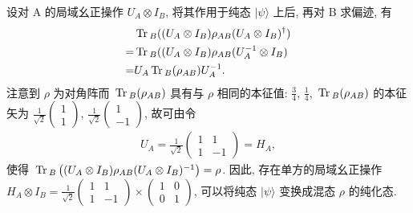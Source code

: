 \documentclass{assignment}
\begin{document}
\begin{sol}
\begin{itemize}
        设对 A 的局域幺正操作 $U_A\otimes I_B$, 将其作用于纯态 $\lvert\psi\rangle$ 上后, 再对 B 求偏迹, 有
        \begin{align}
            \notag&\,\mathrm{Tr}\,_B((U_A\otimes I_B)\rho_{AB}(U_A\otimes I_B)^{\dagger})\\
            =&\,\mathrm{Tr}\,_B((U_A\otimes I_B)\rho_{AB}(U_A^{-1}\otimes I_B)\\
            =&U_A\,\mathrm{Tr}\,_B(\rho_{AB})U_A^{-1}.
        \end{align}
        注意到 $\rho$ 为对角阵而 $\,\mathrm{Tr}\,_B(\rho_{AB})$ 具有与 $\rho$ 相同的本征值: $\frac{3}{4}$, $\frac{1}{4}$, $\,\mathrm{Tr}\,_B(\rho_{AB})$ 的本征矢为 $\frac{1}{\sqrt{2}}\begin{pmatrix}
            1\\
            1
        \end{pmatrix}$, $\frac{1}{\sqrt{2}}\begin{pmatrix}
            1\\
            -1
        \end{pmatrix}$, 故可由令
        \begin{align}
            U_A=\frac{1}{\sqrt{2}}\begin{pmatrix}
                1&1\\
                1&-1
            \end{pmatrix}=H_A,
        \end{align}
        使得 $\,\mathrm{Tr}\,_B\left((U_A\otimes I_B)\rho_{AB}(U_A\otimes I_B)^{-1}\right)=\rho$. 因此, 存在单方的局域幺正操作 $H_A\otimes I_B=\frac{1}{\sqrt{2}}\begin{pmatrix}
            1&1\\
            1&-1
        \end{pmatrix}\times\begin{pmatrix}
            1&0\\
            0&1
        \end{pmatrix}$, 可以将纯态 $\lvert\psi\rangle$ 变换成混态 $\rho$ 的纯化态.


\end{itemize}
\end{sol}
\end{document}
